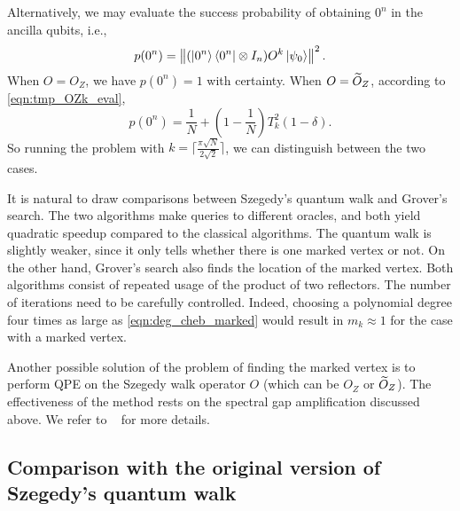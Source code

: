 \begin{rem}
Alternatively, we may evaluate the success probability of obtaining $0^n$ in the ancilla qubits, i.e.,
\begin{equation}
p(0^n)=\left\lVert(\ket{0^n}\bra{0^n}\otimes I_n)O^k\ket{\psi_0}\right\rVert^2.
\end{equation}
When $O=O_Z$, we have $p(0^n)=1$ with certainty. 
When $O=\widetilde{O}_Z$, according to \cref{eqn:tmp_OZk_eval},
\begin{equation}
p(0^n)=\frac{1}{N}+\left(1-\frac{1}{N}\right)T^2_k(1-\delta).
\end{equation}
So running the problem with $k=\lceil\frac{\pi\sqrt{N}}{2\sqrt{2}} \rceil$, we can distinguish between the two cases.
\end{rem}

\begin{rem}
It is natural to draw comparisons between Szegedy's quantum walk and Grover's search. The two algorithms make queries to different oracles, and both yield quadratic speedup compared to the classical algorithms.
The quantum walk is slightly weaker, since it only tells whether there is one marked vertex or not. 
On the other hand, Grover's search also finds the location of the marked vertex.
Both algorithms consist of repeated usage of the product of two reflectors.
The number of iterations need to be carefully controlled. 
Indeed, choosing a polynomial degree four times as large as \cref{eqn:deg_cheb_marked} would result in $m_k\approx 1$ for the case with a marked vertex. 
\end{rem}


\begin{rem}
Another possible solution of the problem of finding the marked vertex is to perform QPE on the Szegedy walk operator $O$ (which can be $O_Z$ or $\widetilde{O}_Z$).
The effectiveness of the method rests on the spectral gap amplification discussed above. We refer to ~\cite[Chapter 17]{ChildsQuantumLec} for more details.
\end{rem}

\subsection{Comparison with the original version of Szegedy's quantum walk}

